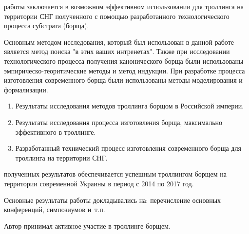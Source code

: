 {\influence} работы заключается в возможном эффективном использовании для троллинга на территории СНГ полученного с помощью разработанного технологического процесса субстрата (борща).

{\methods} Основным методом исследования, который был использован в данной работе является метод поиска "в этих ваших интренетах".  Также при исследовании технологического процесса получения канонического борща были использованы эмпирическо-теоритические методы и метод индукции. При разработке процесса изготовления современного борща были использованы методы моделирования и формализации.

{}
\begin{enumerate}
  \item Результаты исследования методов троллинга борщом в Российской империи.
  \item Результаты исследования процесса изготовления борща, максимально эффективного в троллинге.
  \item Разработанный технический процесс изготовления современного борща для троллинга на территории СНГ.
\end{enumerate}


{\reliability} полученных результатов обеспечивается успешным троллингом борщем на территории современной Украины в период с 2014 по 2017 год.

{\probation}
Основные результаты работы докладывались на: перечисление основных конференций, симпозиумов и~т.\:п.

{\contribution} Автор принимал активное участие в троллинге борщем.


